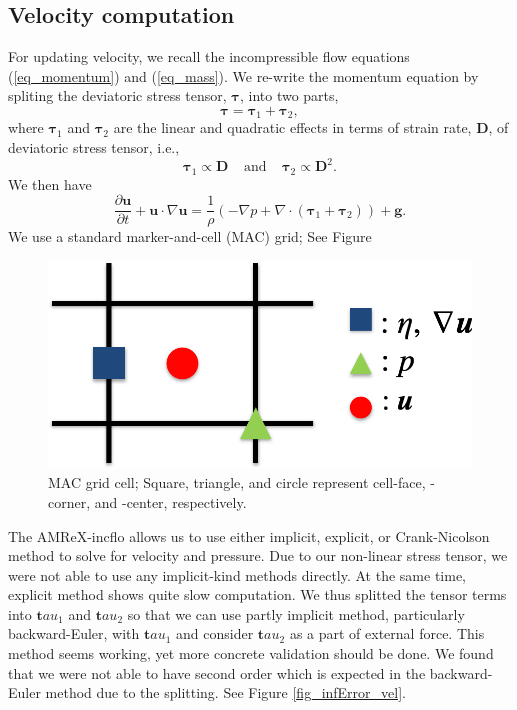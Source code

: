 \subsection{Velocity computation}
For updating velocity, we recall the incompressible flow equations (\ref{eq_momentum}) and (\ref{eq_mass}). We re-write the momentum equation by spliting the deviatoric stress tensor, ${\bm \tau}$, into two parts, 
\[
 {\bm \tau}= {\bm \tau_1} + {\bm \tau_2},
\] 
where ${\bm \tau_1}$ and ${\bm \tau_2}$ are the linear and quadratic effects in terms of strain rate, ${\bm D}$, of deviatoric stress tensor, i.e., 
\[
  {\boldsymbol \tau_1} \propto \boldsymbol{D}
  \ \ \ \ \ \text{and}
   \ \ \ \ \ 
{\boldsymbol \tau_2} \propto {\boldsymbol D^2}.
\]
We then have
\begin{equation}
  \frac{\partial {\bm u}}{\partial t} 
  + {\bm u} \cdot \nabla {\bm u} = \frac{1}{\rho}
  \left( 
    -\nabla p + \nabla \cdot \left( {\bm \tau_1} + {\bm \tau_2} \right)\right) + {\bm g}.
  \label{eq_momentum2}
\end{equation}
We use a standard marker-and-cell (MAC) grid; See Figure 
\begin{figure}[ht]
	\begin{center}
	
		\includegraphics[scale=0.5]{figures/fig_mac_grid.png}
		\caption{MAC grid cell; Square, triangle, and circle represent cell-face, -corner, and -center, respectively.}
	\label{fig_mac_grid}
	\end{center}
\end{figure}
The AMReX-incflo allows us to use either implicit, explicit, or Crank-Nicolson method to solve for velocity and pressure. Due to our non-linear stress tensor, we were not able to use any implicit-kind methods directly. At the same time, explicit method shows quite slow computation. We thus splitted the tensor terms into ${\bm tau_1}$ and
${\bm tau_2}$ so that we can use partly implicit method, particularly backward-Euler, with ${\bm tau_1}$ and consider ${\bm tau_2}$ as a part of external force. This method seems working, yet more concrete validation should be done. We found that we were not able to have second order which is expected in the backward-Euler method due to the splitting. See Figure \ref{fig_infError_vel}.
